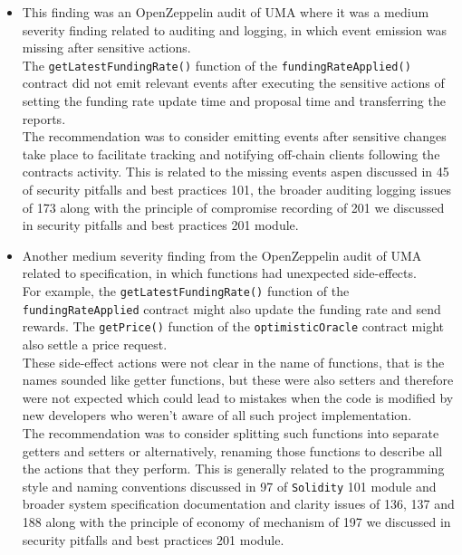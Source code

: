 \begin{itemize}
\item
  This finding was an OpenZeppelin audit of UMA where it was a medium
  severity finding related to auditing and logging, in which event
  emission was missing after sensitive actions.\\

  The \texttt{getLatestFundingRate()} function of the
  \texttt{fundingRateApplied()} contract did not emit relevant events
  after executing the sensitive actions of setting the funding rate
  update time and proposal time and transferring the reports.\\

  The recommendation was to consider emitting events after sensitive
  changes take place to facilitate tracking and notifying off-chain
  clients following the contracts activity. This is related to the
  missing events aspen discussed in 45 of security pitfalls and best
  practices 101, the broader auditing logging issues of 173 along with
  the principle of compromise recording of 201 we discussed in security
  pitfalls and best practices 201 module.
\item
  Another medium severity finding from the OpenZeppelin audit of UMA
  related to specification, in which functions had unexpected
  side-effects.\\

  For example, the \texttt{getLatestFundingRate()} function of the
  \texttt{fundingRateApplied} contract might also update the funding
  rate and send rewards. The \texttt{getPrice()} function of the
  \texttt{optimisticOracle} contract might also settle a price
  request.\\

  These side-effect actions were not clear in the name of functions,
  that is the names sounded like getter functions, but these were also
  setters and therefore were not expected which could lead to mistakes
  when the code is modified by new developers who weren't aware of all
  such project implementation.\\

  The recommendation was to consider splitting such functions into
  separate getters and setters or alternatively, renaming those
  functions to describe all the actions that they perform. This is
  generally related to the programming style and naming conventions
  discussed in 97 of \texttt{Solidity} 101 module and broader system
  specification documentation and clarity issues of 136, 137 and 188
  along with the principle of economy of mechanism of 197 we discussed
  in security pitfalls and best practices 201 module.
\end{itemize}

